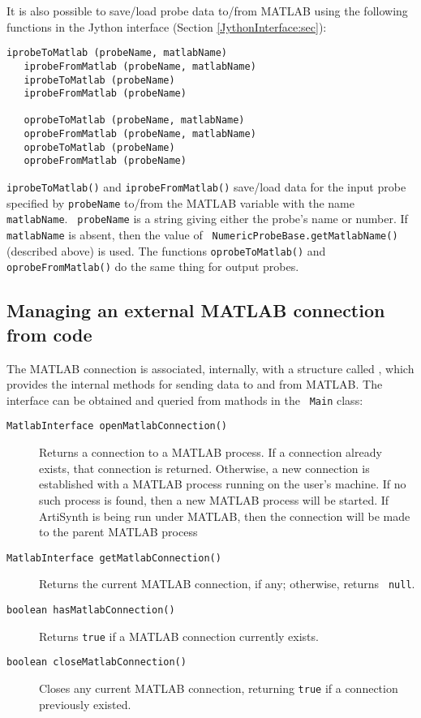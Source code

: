 \documentclass{article}
\begin{document}
It is also possible to save/load probe data to/from MATLAB using the
following functions in the Jython interface (Section
\ref{JythonInterface:sec}):
%
\begin{lstlisting}[]
   iprobeToMatlab (probeName, matlabName)
   iprobeFromMatlab (probeName, matlabName)
   iprobeToMatlab (probeName)
   iprobeFromMatlab (probeName)

   oprobeToMatlab (probeName, matlabName)
   oprobeFromMatlab (probeName, matlabName)
   oprobeToMatlab (probeName)
   oprobeFromMatlab (probeName)
\end{lstlisting}
%
{\tt iprobeToMatlab()} and {\tt iprobeFromMatlab()}
save/load data for the input probe specified by {\tt probeName}
to/from the MATLAB variable with the name {\tt matlabName}. {\tt
probeName} is a string giving either the probe's name or number.  If
{\tt matlabName} is absent, then the value of {\tt
NumericProbeBase.getMatlabName()} (described above) is used.  The
functions {\tt oprobeToMatlab()} and {\tt oprobeFromMatlab()} do the
same thing for output probes.

\subsection{Managing an external MATLAB connection from code}
\label{MatlabFromCode:sec}

The MATLAB connection is associated, internally, with a structure
called , which
provides the internal methods for sending data to and from MATLAB.
The interface can be obtained and queried from mathods in the {\tt
Main} class:

\begin{description}

\item[{\tt MatlabInterface openMatlabConnection()}] \mbox{}

Returns a connection to a MATLAB process. If a connection already
exists, that connection is returned. Otherwise, a new connection is
established with a MATLAB process running on the user's machine.  If
no such process is found, then a new MATLAB process will be
started. If ArtiSynth is being run under MATLAB, then the connection
will be made to the parent MATLAB process

\item[{\tt MatlabInterface getMatlabConnection()}] \mbox{}

Returns the current MATLAB connection, if any; otherwise, returns {\tt
null}.

\item[{\tt boolean hasMatlabConnection()}] \mbox{}

Returns {\tt true} if a MATLAB connection currently exists.

\item[{\tt boolean closeMatlabConnection()}] \mbox{}

Closes any current MATLAB connection, returning {\tt true} if a
connection previously existed.

\end{description}
\end{document}
